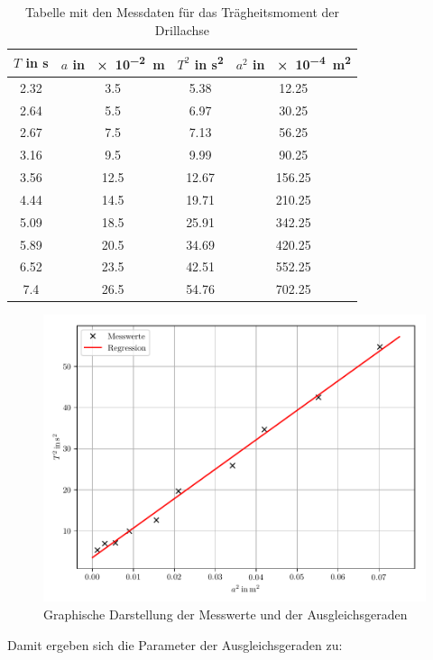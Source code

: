 \begin{table}
  \centering
  \caption{Tabelle mit den Messdaten für das Trägheitsmoment der Drillachse}
  \begin{tabular}{c c c c}
    \toprule
    $T$ in \si{\second} & $a$ in \SI{e-2}{\meter} & $T^2$ in \si{\second\squared} &
    $a^2$ in \SI{e-4}{\meter\squared} \\
    \midrule
    2.32 & 3.5  & 5.38  & 12.25 \\
    2.64 & 5.5  & 6.97  & 30.25 \\
    2.67 & 7.5  & 7.13  & 56.25 \\
    3.16 & 9.5  & 9.99  & 90.25 \\
    3.56 & 12.5 & 12.67 & 156.25 \\
    4.44 & 14.5 & 19.71 & 210.25 \\
    5.09 & 18.5 & 25.91 & 342.25 \\
    5.89 & 20.5 & 34.69 & 420.25 \\
    6.52 & 23.5 & 42.51 & 552.25 \\
    7.4  & 26.5 & 54.76 &  702.25 \\
    \bottomrule
  \end{tabular}
\end{table}

\begin{figure}[H]
  \centering
  \includegraphics[width=\textwidth]{ausgleichsgerade1.pdf}
  \caption{Graphische Darstellung der Messwerte und der Ausgleichsgeraden}
\end{figure}

Damit ergeben sich die Parameter der Ausgleichsgeraden zu:

